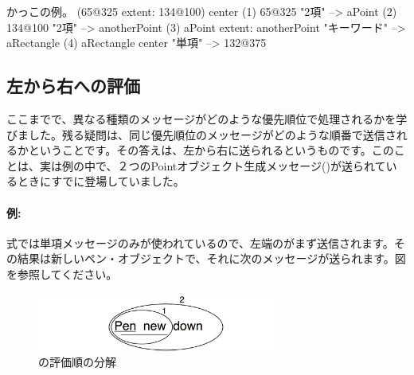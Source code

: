 \documentclass[a4paper,10pt,twoside]{book}
\begin{document}
\begin{example}[decExtent]{かっこの例。}{}
      (65@325 extent: 134@100) center
(1)   65@325                                                    "2項"
    --> aPoint
(2)                                134@100                     "2項"
                                 --> anotherPoint
(3)   aPoint extent: anotherPoint                       "キーワード"
      --> aRectangle
(4)   aRectangle center                                     "単項"
      --> 132@375
\end{example}

\subsection{左から右への評価}
ここまでで、異なる種類のメッセージがどのような優先順位で処理されるかを学びました。残る疑問は、同じ優先順位のメッセージがどのような順番で送信されるかということです。その答えは、左から右に送られるというものです。このことは、実は例の中で、２つのPointオブジェクト生成メッセージ()が送られているときにすでに登場していました。



\paragraph{例:} 式では単項メッセージのみが使われているので、左端のがまず送信されます。その結果は新しいペン・オブジェクトで、それに次のメッセージが送られます。図を参照してください。

\begin{figure}
	\centering
	\includegraphics[width=8cm]{ucompoUn}
	\caption{の評価順の分解}
\end{figure}
\end{document}
